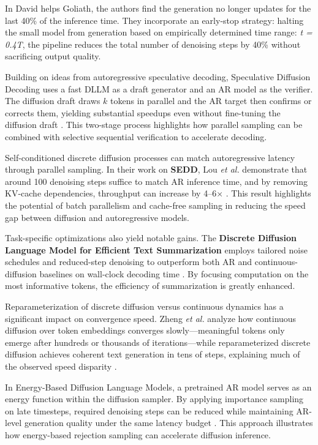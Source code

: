 

In David helps Goliath, the authors find the generation no longer updates for the last 40\% of the inference time. They incorporate an early-stop strategy: halting the small model from generation based on empirically determined time range: \textit{t = 0.4T}, the pipeline reduces the total number of denoising steps by 40\% without sacrificing output quality. \cite{han_david_2024} 

Building on ideas from autoregressive speculative decoding, Speculative Diffusion Decoding uses a fast DLLM as a draft generator and an AR model as the verifier. The diffusion draft draws $k$ tokens in parallel and the AR target then confirms or corrects them, yielding substantial speedups even without fine-tuning the diffusion draft \cite{christopher_speculative_2025}. This two-stage process highlights how parallel sampling can be combined with selective sequential verification to accelerate decoding.

Self-conditioned discrete diffusion processes can match autoregressive latency through parallel sampling. In their work on \textbf{SEDD}, Lou \emph{et al.} demonstrate that around 100 denoising steps suffice to match AR inference time, and by removing KV-cache dependencies, throughput can increase by 4–6× \cite{lou_discrete_2024}. This result highlights the potential of batch parallelism and cache-free sampling in reducing the speed gap between diffusion and autoregressive models.

Task-specific optimizations also yield notable gains. The \textbf{Discrete Diffusion Language Model for Efficient Text Summarization} employs tailored noise schedules and reduced-step denoising to outperform both AR and continuous-diffusion baselines on wall-clock decoding time \cite{dat_discrete_2025}. By focusing computation on the most informative tokens, the efficiency of summarization is greatly enhanced.

Reparameterization of discrete diffusion versus continuous dynamics has a significant impact on convergence speed. Zheng \emph{et al.} analyze how continuous diffusion over token embeddings converges slowly—meaningful tokens only emerge after hundreds or thousands of iterations—while reparameterized discrete diffusion achieves coherent text generation in tens of steps, explaining much of the observed speed disparity \cite{zheng_reparameterized_2024}.

In Energy-Based Diffusion Language Models, a pretrained AR model serves as an energy function within the diffusion sampler. By applying importance sampling on late timesteps, required denoising steps can be reduced while maintaining AR-level generation quality under the same latency budget \cite{xu_energy-based_2025}. This approach illustrates how energy-based rejection sampling can accelerate diffusion inference.

